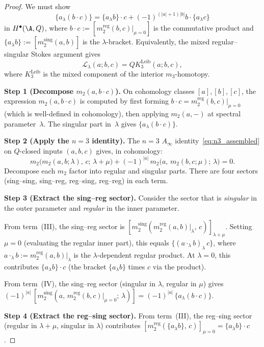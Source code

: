 \begin{proof}
We must show
\[
\{a_\lambda (b\cdot c)\}
=
\{a_\lambda b\}\cdot c
+
(-1)^{(|a|+1)|b|}b\cdot\{a_\lambda c\}
\]
in $H^\bullet(\A,Q)$, where $b\cdot c := [m_2^{\mathrm{reg}}(b,c)|_{\mu=0}]$ is the
commutative product and $\{a_\lambda b\} := [m_2^{\mathrm{sing}}(a,b)]$ is the
$\lambda$-bracket.
Equivalently, the mixed regular--singular Stokes argument gives
\[
\mathcal L_\lambda(a;b,c)=QK_3^{\mathrm{Leib}}(a;b,c),
\]
where \(K_3^{\mathrm{Leib}}\) is the mixed component of the interior
\(m_3\)-homotopy.

\textbf{Step 1 (Decompose $m_2(a, b\cdot c)$).}
On cohomology classes $[a],[b],[c]$, the expression $m_2(a, b\cdot c)$
is computed by first forming $b\cdot c = m_2^{\mathrm{reg}}(b,c)|_{\mu=0}$
(which is well-defined in cohomology), then applying $m_2(a,-)$ at
spectral parameter~$\lambda$. The singular part in~$\lambda$ gives
$\{a_\lambda (b\cdot c)\}$.

\textbf{Step 2 (Apply the $n=3$ identity).}
The $n=3$ $A_\infty$ identity~\eqref{eq:n3_assembled} on $Q$-closed inputs
$(a,b,c)$ gives, in cohomology:
\[
m_2\bigl(m_2(a,b;\lambda),\,c;\,\lambda{+}\mu\bigr)
+ (-1)^{|a|}\, m_2\bigl(a,\,m_2(b,c;\mu);\,\lambda\bigr)
= 0.
\]
Decompose each $m_2$ factor into regular and singular parts. There
are four sectors (sing--sing, sing--reg, reg--sing, reg--reg) in each term.

\textbf{Step 3 (Extract the sing--reg sector).}
Consider the sector that is \emph{singular} in the outer parameter
and \emph{regular} in the inner parameter.

From term~(III), the sing--reg sector is
$[m_2^{\mathrm{sing}}(m_2^{\mathrm{reg}}(a,b)|_{\lambda},\, c)]_{\lambda+\mu}$.
Setting $\mu=0$ (evaluating the regular inner part), this equals
$\{(a\cdot_\lambda b)_{\lambda}\, c\}$, where $a\cdot_\lambda b :=
m_2^{\mathrm{reg}}(a,b)|_\lambda$ is the $\lambda$-dependent regular product.
At $\lambda=0$, this contributes $\{a_\lambda b\}\cdot c$
(the bracket $\{a_\lambda b\}$ times $c$ via the product).

From term~(IV), the sing--reg sector (singular in $\lambda$,
regular in $\mu$) gives
$(-1)^{|a|}\,[m_2^{\mathrm{sing}}(a,\, m_2^{\mathrm{reg}}(b,c)|_{\mu=0};\,\lambda)]
= (-1)^{|a|}\, \{a_\lambda(b\cdot c)\}$.

\textbf{Step 4 (Extract the reg--sing sector).}
From term~(III), the reg--sing sector (regular in $\lambda+\mu$,
singular in $\lambda$) contributes
$[m_2^{\mathrm{reg}}(\{a_\lambda b\},\, c)]_{\mu=0} = \{a_\lambda b\}\cdot c$.


\end{proof}
